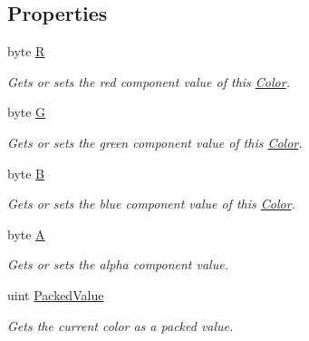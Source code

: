 \subsection*{Properties}
\begin{DoxyCompactItemize}
\item 
byte \hyperlink{struct_microsoft_1_1_xna_1_1_framework_1_1_color_a9fb9559a789d7b5c4bfb9415e5f13457}{R}
\begin{DoxyCompactList}\small\item\em Gets or sets the red component value of this \hyperlink{struct_microsoft_1_1_xna_1_1_framework_1_1_color}{Color}.\end{DoxyCompactList}\item 
byte \hyperlink{struct_microsoft_1_1_xna_1_1_framework_1_1_color_aee37e15ba109bc57b629b03c734a5a1e}{G}
\begin{DoxyCompactList}\small\item\em Gets or sets the green component value of this \hyperlink{struct_microsoft_1_1_xna_1_1_framework_1_1_color}{Color}.\end{DoxyCompactList}\item 
byte \hyperlink{struct_microsoft_1_1_xna_1_1_framework_1_1_color_aad34eaa1b49f2e7b91bc660046767b0c}{B}
\begin{DoxyCompactList}\small\item\em Gets or sets the blue component value of this \hyperlink{struct_microsoft_1_1_xna_1_1_framework_1_1_color}{Color}.\end{DoxyCompactList}\item 
byte \hyperlink{struct_microsoft_1_1_xna_1_1_framework_1_1_color_a86f84715322d1976c298943498a0eee8}{A}
\begin{DoxyCompactList}\small\item\em Gets or sets the alpha component value.\end{DoxyCompactList}\item 
uint \hyperlink{struct_microsoft_1_1_xna_1_1_framework_1_1_color_a21cac7988be47762452b0ccc02c9c726}{Packed\+Value}
\begin{DoxyCompactList}\small\item\em Gets the current color as a packed value.\end{DoxyCompactList}\item 

\end{DoxyCompactItemize}
